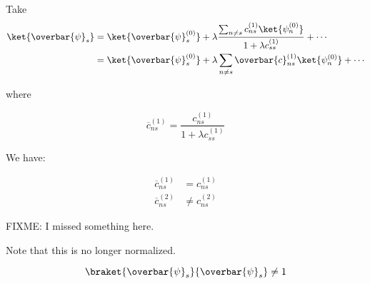 Take
\begin{align*}
\ket{\overbar{\psi}_s}
&=
\ket{\overbar{\psi}_s^{(0)}}
+ 
\lambda
\frac{
\sum_{n \ne s} c_{ns}^{(1)} 
\ket{\psi_n^{(0)}}
}
{
1 + \lambda c_{ss}^{(1)}
} 
+ \cdots
\\
&=
\ket{\overbar{\psi}_s^{(0)}}
+ 
\lambda
\sum_{n \ne s} \overbar{c}_{ns}^{(1)} 
\ket{\psi_n^{(0)}} + \cdots
\end{align*}

where 

\begin{equation}\label{eqn:qmTwoL3:n}
\overbar{c}_{ns}^{(1)}  =
\frac{c_{ns}^{(1)} }
{
1 + \lambda c_{ss}^{(1)}
} 
\end{equation}

We have: 

\begin{align*}
\overbar{c}_{ns}^{(1)} &= c_{ns}^{(1)} \\
\overbar{c}_{ns}^{(2)} &\ne c_{ns}^{(2)} 
\end{align*}

FIXME: I missed something here.

Note that this is no longer normalized.

\begin{equation}\label{eqn:qmTwoL3:530}
\braket{\overbar{\psi}_s}{\overbar{\psi}_s} \ne 1
\end{equation}


